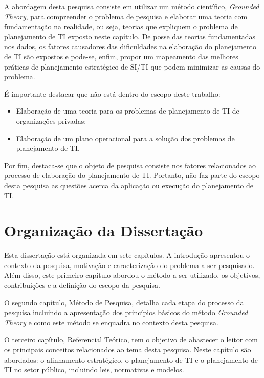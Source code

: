 A abordagem desta pesquisa consiste em utilizar um método científico, \textit{Grounded Theory}, para compreender o problema de pesquisa e elaborar uma teoria com fundamentação na realidade, ou seja, teorias que expliquem o problema de planejamento de TI exposto neste capítulo. De posse das teorias fundamentadas nos dados, os fatores causadores das dificuldades na elaboração do planejamento de TI são expostos e pode-se, enfim, propor um mapeamento das melhores práticas de planejamento estratégico de SI/TI que podem minimizar as causas do problema.

É importante destacar que não está dentro do escopo deste trabalho:

\begin{itemize}
\item Elaboração de uma teoria para os problemas de planejamento de TI de organizações privadas;
\item Elaboração de um plano operacional para a solução dos problemas de planejamento de TI.
\end{itemize}

Por fim, destaca-se que o objeto de pesquisa consiste nos fatores relacionados ao processo de elaboração do planejamento de TI. Portanto, não faz parte do escopo desta pesquisa as questões acerca da aplicação ou execução do planejamento de TI.
	
\section{Organização da Dissertação}
Esta dissertação está organizada em sete capítulos. A introdução apresentou o contexto da pesquisa, motivação e caracterização do problema a ser pesquisado. Além disso, este primeiro capítulo abordou o método a ser utilizado, os objetivos, contribuições e a definição do escopo da pesquisa.

O segundo capítulo, Método de Pesquisa, detalha cada etapa do processo da pesquisa incluindo a apresentação dos princípios básicos do método \textit{Grounded Theory} e como este método se enquadra no contexto desta pesquisa.

O terceiro capítulo, Referencial Teórico, tem o objetivo de abastecer o leitor com os principais conceitos relacionados ao tema desta pesquisa. Neste capítulo são abordados: o alinhamento estratégico, o planejamento de TI e o planejamento de TI no setor público, incluindo leis, normativas e modelos.


